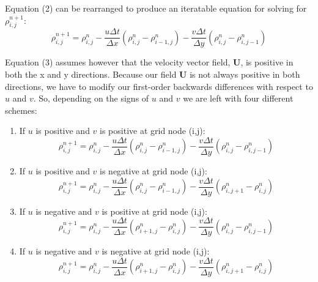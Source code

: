 \documentclass[12pt]{article}
\begin{document}
Equation (2) can be rearranged to produce an iteratable equation for solving for $ \rho_{i,j}^{n+1}$:
\begin{equation}
\rho_{i,j}^{n+1} = \rho_{i,j}^{n} - \frac{u\Delta t}{\Delta x}(\rho_{i,j}^{n}-\rho_{i-1,j}^{n})-\frac{v\Delta t}{\Delta y}(\rho_{i,j}^{n}-\rho_{i,j-1}^{n})
\end{equation}

Equation (3) assumes however that the velocity vector field, \textbf{U}, is positive in both the x and y directions. Because our field \textbf{U} is not always positive in both directions, we have to modify our first-order backwards differences with respect to $u$ and $v$. So, depending on the signs of $u$ and $v$ we are left with four different schemes:
\begin {enumerate}
\item If $u$ is positive and $v$ is positive at grid node (i,j):
\begin{equation}
\rho_{i,j}^{n+1} = \rho_{i,j}^{n} - \frac{u\Delta t}{\Delta x}(\rho_{i,j}^{n}-\rho_{i-1,j}^{n})-\frac{v\Delta t}{\Delta y}(\rho_{i,j}^{n}-\rho_{i,j-1}^{n}) \tag{3.1}
\end{equation}
\item If $u$ is positive and $v$ is negative at grid node (i,j):
\begin{equation}
\rho_{i,j}^{n+1} = \rho_{i,j}^{n} - \frac{u\Delta t}{\Delta x}(\rho_{i,j}^{n}-\rho_{i-1,j}^{n})-\frac{v\Delta t}{\Delta y}(\rho_{i,j+1}^{n}-\rho_{i,j}^{n}) \tag{3.2}
\end{equation}
\item If $u$ is negative and $v$ is positive at grid node (i,j):
\begin{equation}
\rho_{i,j}^{n+1} = \rho_{i,j}^{n} - \frac{u\Delta t}{\Delta x}(\rho_{i+1,j}^{n}-\rho_{i,j}^{n})-\frac{v\Delta t}{\Delta y}(\rho_{i,j}^{n}-\rho_{i,j-1}^{n}) \tag{3.3}
\end{equation}
\item If $u$ is negative and $v$ is negative at grid node (i,j):
\begin{equation}
\rho_{i,j}^{n+1} = \rho_{i,j}^{n} - \frac{u\Delta t}{\Delta x}(\rho_{i+1,j}^{n}-\rho_{i,j}^{n})-\frac{v\Delta t}{\Delta y}(\rho_{i,j+1}^{n}-\rho_{i,j}^{n}) \tag{3.4}
\end{equation}
\end{enumerate}
\end{document}
